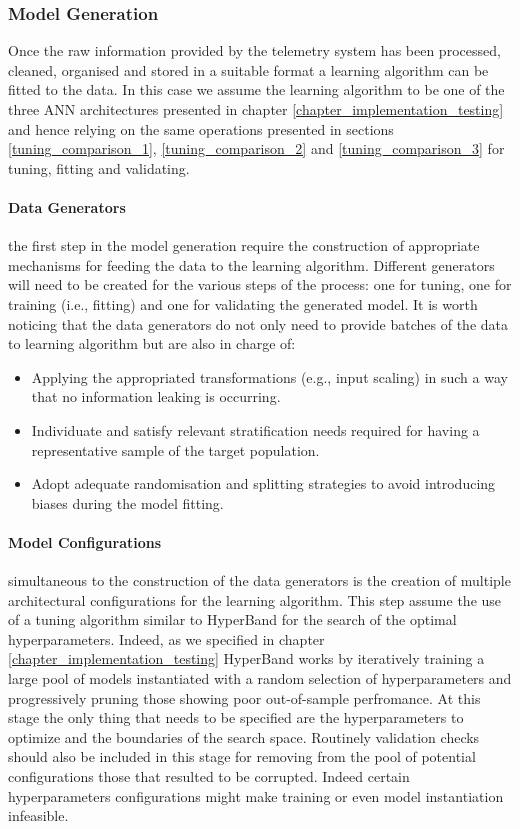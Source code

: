 \subsubsection{Model Generation}
\label{model_generation}
Once the raw information provided by the telemetry system has been processed, cleaned, organised and stored in a suitable format a learning algorithm can be fitted to the data. In this case we assume the learning algorithm to be one of the three ANN architectures presented in chapter \ref{chapter_implementation_testing} and hence relying on the same operations presented in sections \ref{tuning_comparison_1}, \ref{tuning_comparison_2} and \ref{tuning_comparison_3} for tuning, fitting and validating.

\paragraph*{Data Generators} the first step in the model generation require the construction of appropriate mechanisms for feeding the data to the learning algorithm. Different generators will need to be created for the various steps of the process: one for tuning, one for training (i.e., fitting) and one for validating the generated model. It is worth noticing that the data generators do not only need to provide batches of the data to learning algorithm but are also in charge of: 

\begin{itemize}
    \item Applying the appropriated transformations (e.g., input scaling) in such a way that no information leaking is occurring.
    \item Individuate and satisfy relevant stratification needs required for having a representative sample of the target population.
    \item Adopt adequate randomisation and splitting strategies to avoid introducing biases during the model fitting.
\end{itemize}

\paragraph*{Model Configurations} simultaneous to the construction of the data generators is the creation of multiple architectural configurations for the learning algorithm. This step assume the use of a tuning algorithm similar to HyperBand \cite{li2017hyperband} for the search of the optimal hyperparameters. Indeed, as we specified in chapter \ref{chapter_implementation_testing} HyperBand works by iteratively training a large pool of models instantiated with a random selection of hyperparameters and progressively pruning those showing poor out-of-sample perfromance. At this stage the only thing that needs to be specified are the hyperparameters to optimize and the boundaries of the search space. Routinely validation checks should also be included in this stage for removing from the pool of potential configurations those that resulted to be corrupted. Indeed certain hyperparameters configurations might make training or even model instantiation infeasible.

